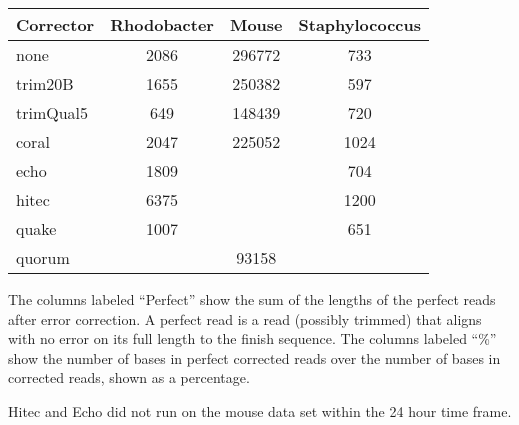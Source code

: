 \documentclass[10pt]{bmc_article}
\newenvironment{bmcformat}{\fussy\setboolean{publ}{true}}{\fussy}
\begin{document}
\begin{bmcformat}
\begin{tabular}{@{}lS[detect-weight,table-format=4]S[detect-weight,table-format=6]S[detect-weight,table-format=4]@{}}
\toprule
{Corrector} & {Rhodobacter} & {Mouse}        & {Staphylococcus} \\
\midrule                                                   
none        & 2086          & 296772         & 733              \\
trim20B     & 1655          & 250382         & 597              \\
trimQual5   & 649           & 148439         & 720              \\
coral       & 2047          & 225052         & 1024             \\
echo        & 1809          &                & 704              \\
hitec       & 6375          &                & 1200             \\
quake       & 1007          &  & 651              \\
quorum      &   & 93158          &      \\
\bottomrule
\end{tabular}

%
%
\label{table:perfect-reads}

The columns labeled ``Perfect'' show the sum of the lengths of the perfect reads after error correction.
A perfect read is a read (possibly trimmed) that aligns with no error on its full length to the finish sequence.
The columns labeled ``\%'' show the number of bases in perfect corrected reads over the number of bases in corrected reads, shown as a percentage.

Hitec and Echo did not run on the mouse data set within the 24 hour time frame.



\bigskip


\end{bmcformat}
\end{document}
